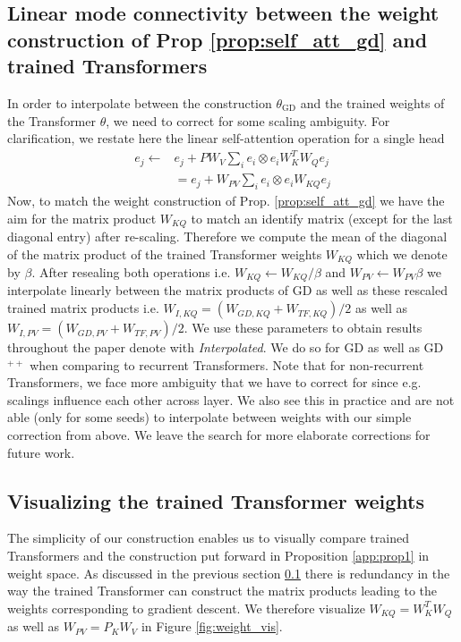 \documentclass{article}
\theoremstyle{plain}
\theoremstyle{definition}
\theoremstyle{remark}
\begin{document}
\subsection{Linear mode connectivity between the weight construction of Prop \ref{prop:self_att_gd} and trained Transformers }
\label{app:mode_connect}

In order to interpolate between the construction $\theta_{\text{GD}}$
and the trained weights of the Transformer $\theta$, we need to correct for some scaling ambiguity. For clarification, we restate here the linear self-attention operation for a single head
\begin{align}
e_j  \leftarrow & e_j + P W_{V}\sum_{i} e_{i} \otimes e_{i} W_{K}^T W_{Q}e_{j} \\
 &= e_j + W_{PV} \sum_{i} e_{i} \otimes e_{i} W_{KQ} e_{j} 
\end{align}
Now, to match the weight construction of Prop. \ref{prop:self_att_gd} we have the aim for the matrix product $W_{KQ}$ to match an identify matrix (except for the last diagonal entry) after re-scaling. Therefore we compute the mean of the diagonal of the matrix product of the trained Transformer weights $W_{KQ}$ which we denote by $\beta$.  After resealing both operations i.e. $W_{KQ} \leftarrow W_{KQ}/\beta$
and $W_{PV} \leftarrow W_{PV}\beta$ we interpolate linearly between the matrix products of GD as well as these rescaled trained matrix products i.e. $W_{I, KQ} = (W_{GD, KQ} + W_{TF, KQ})/2$ as well as 
$W_{I, PV} = (W_{GD, PV} + W_{TF, PV})/2$. We use these parameters to obtain results throughout the paper denote with \textit{Interpolated}.
We do so for GD as well as GD$^{++}$ when comparing to recurrent Transformers. Note that for non-recurrent Transformers, we face more ambiguity that we have to correct for since e.g. scalings influence each other across layer. We also see this in practice and are not able (only for some seeds) to interpolate between weights with our simple correction from above. We leave the search for more elaborate corrections for future work.  

\subsection{Visualizing the trained Transformer weights}

The simplicity of our construction enables us to visually compare trained Transformers and the construction put forward in Proposition \ref{app:prop1} in weight space. As discussed in the previous section \ref{app:mode_connect} there is redundancy in the way the trained Transformer can construct the matrix products leading to the weights corresponding to gradient descent. We therefore visualize $W_{KQ}=W^T_KW_Q$ as well as $W_{PV}=P_KW_V$ in Figure \ref{fig:weight_vis}. 
\end{document}
